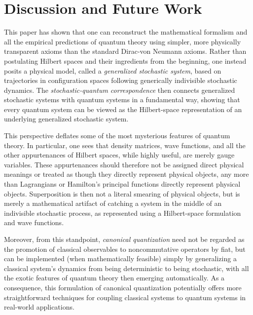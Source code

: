 \documentclass[12pt,english,prl,superscriptaddress,nobibnotes,nofootinbib]{revtex4-2}
\begin{document}
\section{Discussion and Future Work\label{sec:Discussion-and-Future-Work}}

This paper has shown that one can reconstruct the mathematical formalism
and all the empirical predictions of quantum theory using simpler,
more physically transparent axioms than the standard Dirac-von Neumann
axioms. Rather than postulating Hilbert spaces and their ingredients
from the beginning, one instead posits a physical model, called a
\emph{generalized stochastic system}, based on trajectories in configuration
spaces following generically indivisible stochastic dynamics. The
\emph{stochastic-quantum correspondence} then connects generalized
stochastic systems with quantum systems in a fundamental way, showing
that every quantum system can be viewed as the Hilbert-space representation
of an underlying generalized stochastic system.

This perspective deflates some of the most mysterious features of
quantum theory. In particular, one sees that density matrices, wave
functions, and all the other appurtenances of Hilbert spaces, while
highly useful, are merely gauge variables. These appurtenances should
therefore not be assigned direct physical meanings or treated as though
they directly represent physical objects, any more than Lagrangians
or Hamilton's principal functions directly represent physical objects.
Superposition is then not a literal smearing of physical objects,
but is merely a mathematical artifact of catching a system in the
middle of an indivisible stochastic process, as represented using
a Hilbert-space formulation and wave functions.

Moreover, from this standpoint, \emph{canonical quantization} need
not be regarded as the promotion of classical observables to noncommutative
operators by fiat, but can be implemented (when mathematically feasible)
simply by generalizing a classical system's dynamics from being deterministic
to being stochastic, with all the exotic features of quantum theory
then emerging automatically. As a consequence, this formulation of
canonical quantization potentially offers more straightforward techniques
for coupling classical systems to quantum systems in real-world applications.
\end{document}
